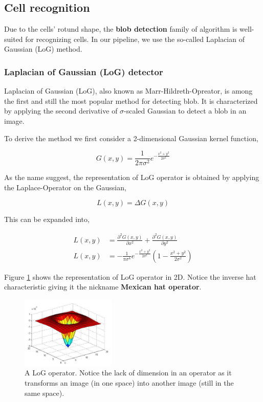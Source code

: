 \documentclass[pdftex,12pt,a4paper]{report}
\begin{document}
\subsection{Cell recognition}
\label{subsection:cell_recognition}

Due to the cells' rotund shape, the \textbf{blob detection} family of algorithm is well-suited for recognizing cells. In our pipeline, we use the so-called Laplacian of Gaussian (LoG) method.

\subsubsection*{Laplacian of Gaussian (LoG) detector}

Laplacian of Gaussian (LoG), also known as Marr-Hildreth-Opreator, is among the first and still the most popular method for detecting blob. It is characterized by applying the second derivative of $\sigma$-scaled Gaussian to detect a blob in an image.

To derive the method we first consider a 2-dimensional Gaussian kernel function,

\begin{equation}
G(x,y) = \frac{1}{{2\pi \sigma^2}} e^{-\frac{x^2 + y^2}{2 \sigma^2}}
\label{equation:gauss_2d_log}
\end{equation}

As the name suggest, the representation of LoG operator is obtained by applying the Laplace-Operator on the Gaussian,

$$
L(x, y) = \Delta G(x, y)
$$

This can be expanded into,

\begin{equation*}
\begin{aligned}
L(x, y) & = \frac{\partial^2 G(x, y)}{\partial x^2} + \frac{\partial^2 G(x, y)}{\partial y^2} \\ 
L(x, y) & = - \frac{1}{\pi \sigma^4} e^{-\frac{x^2 + y^2}{2\sigma^2}} \left( 1 - \frac{x^2 + y^2}{2 \sigma^2}\right)
\end{aligned}
\label{eq:svm_hard_margin}
\end{equation*}

Figure \ref{fig:pixdiff} shows the representation of LoG operator in 2D. Notice the inverse hat characteristic giving it the nickname \textbf{Mexican hat operator}.

\begin{figure}[H]
\centering
\includegraphics[width=0.4\textwidth]{images/log_operator}
\caption{A LoG operator. Notice the lack of dimension in an operator as it transforms an image (in one space) into another image (still in the same space).}
\label{fig:pixdiff}
\end{figure}
\end{document}
